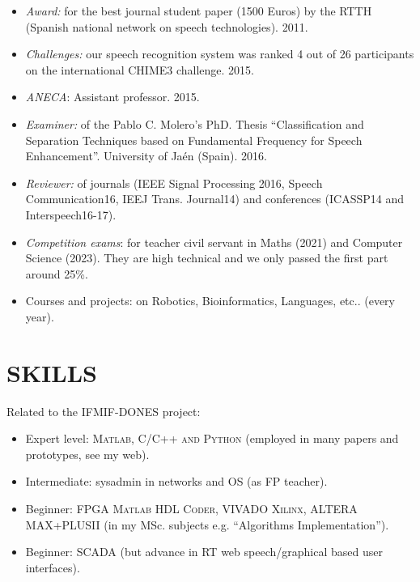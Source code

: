 \documentclass[paper=a4,fontsize=11pt]{scrartcl} %
\newcommand{\NewPart}[1]{\section*{\uppercase{#1}}}
\begin{document}
\begin{itemize}
 \item \textit{Award:} for the best journal student paper  (1500 Euros) by the RTTH (Spanish national network on speech technologies). 2011.
  \item \textit{Challenges:} our speech recognition system  was ranked 4 out of 26 participants on the international CHIME3 challenge. 2015.
 \item \textit{ANECA}: Assistant professor. 2015.
  \item \textit{Examiner:} of the Pablo C. Molero's PhD. Thesis ``Classification and Separation Techniques based on Fundamental Frequency for Speech Enhancement''. University of Ja\'en (Spain). 2016.
 \item \textit{Reviewer:} of journals (IEEE Signal Processing 2016, Speech Communication16, IEEJ Trans. Journal14) and conferences (ICASSP14 and Interspeech16-17). 
 \item \textit{Competition exams}: for teacher civil servant in Maths (2021) and Computer Science (2023). They are high technical and we only passed the first part around 25\%.
 \item Courses and projects: on Robotics, Bioinformatics, Languages, etc.. (every year). 
 
 \end{itemize}



\NewPart{Skills}{}

\noindent Related to the IFMIF-DONES project:
\begin{itemize}
 \item Expert level: \textsc{Matlab, C/C++ and Python} (employed in many papers and prototypes, see my web).
 \item Intermediate: sysadmin in networks and OS (as FP teacher). 
 \item Beginner: FPGA \textsc{Matlab HDL Coder, VIVADO Xilinx, ALTERA MAX+PLUSII} (in my MSc. subjects e.g. ``Algorithms Implementation''). 
 \item Beginner: SCADA (but advance in RT web speech/graphical based user interfaces).
\end{itemize}
\end{document}

